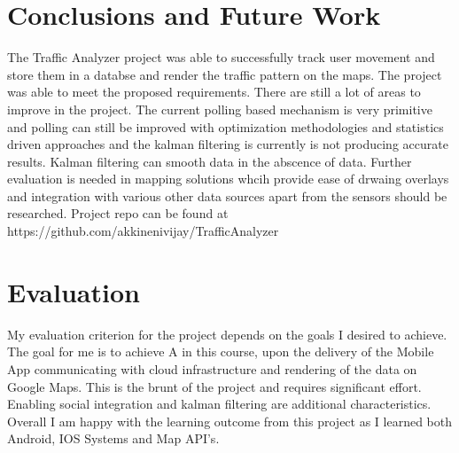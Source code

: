 \documentclass[10pt]{sigplan-proc-varsize}
\begin{document}
\section{Conclusions and Future Work}
 The Traffic Analyzer project was able to successfully track user movement and store them in a databse and render the traffic pattern on the maps. The project was able to meet the proposed requirements. There are still a lot of areas to improve in the project. The current polling based mechanism is very primitive and polling can still be improved with optimization methodologies and statistics driven approaches and the kalman filtering is currently is not producing accurate results. Kalman filtering can smooth data in the abscence of data. Further evaluation is needed in mapping solutions  whcih provide ease of drwaing overlays and integration with various other data sources apart from the sensors should be researched.  Project repo can be found at https://github.com/akkinenivijay/TrafficAnalyzer


\section{Evaluation}
My evaluation criterion for the project depends on the goals I desired to achieve. The goal for me is to achieve A in this course, upon the delivery of the Mobile App communicating with cloud infrastructure and rendering of the data on Google Maps. This is the brunt of the project and requires significant effort. Enabling social integration and kalman filtering are additional characteristics. Overall I am happy with the learning outcome from this project as I learned both Android, IOS Systems and Map API's.

\appendix
%
%


\end{document}
